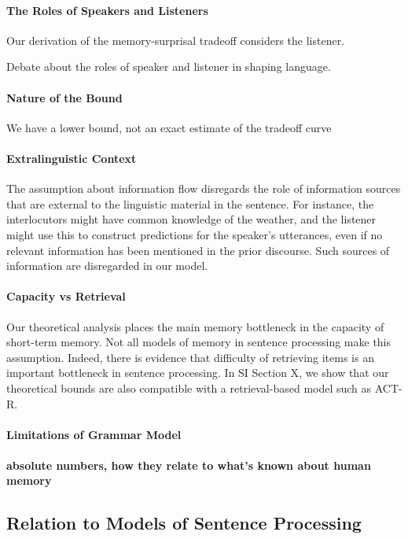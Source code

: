 \paragraph{The Roles of Speakers and Listeners}
Our derivation of the memory-surprisal tradeoff considers the listener.

Debate about the roles of speaker and listener in shaping language.


\paragraph{Nature of the Bound}
We have a lower bound, not an exact estimate of the tradeoff curve

\paragraph{Extralinguistic Context}
The assumption about information flow disregards the role of information sources that are external to the linguistic material in the sentence.
For instance, the interlocutors might have common knowledge of the weather, and the listener might use this to construct predictions for the speaker's utterances, even if no relevant information has been mentioned in the prior discourse.
Such sources of information are disregarded in our model.

\paragraph{Capacity vs Retrieval}
Our theoretical analysis places the main memory bottleneck in the capacity of short-term memory.
Not all models of memory in sentence processing make this assumption.
Indeed, there is evidence that difficulty of retrieving items is an important bottleneck in sentence processing.
In SI Section X, we show that our theoretical bounds are also compatible with a retrieval-based model such as ACT-R.


\paragraph{Limitations of Grammar Model}

\paragraph{absolute numbers, how they relate to what's known about human memory}

\subsection{Relation to Models of Sentence Processing}

